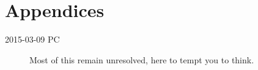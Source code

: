 
\chapter{Appendices}
\label{chap:append}
    \begin{description}
    \item[2015-03-09 PC] Most of this remain unresolved, here to tempt you to think.
    \end{description}





